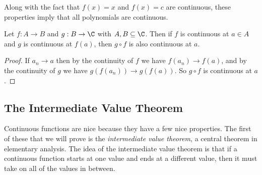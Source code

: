 Along with the fact that $f(x) = x$ and $f(x) = c$ are continuous, these properties imply that all polynomials are continuous.


\begin{proposition}
	Let $f: A \rightarrow B$ and $g: B \rightarrow \C$ with $A, B \subseteq \C$. Then if $f$ is continuous at $a \in A$ and $g$ is continuous at $f(a)$, then $g \circ f$ is also continuous at $a$.
\end{proposition}
\begin{proof}
	If $a_n \rightarrow a$ then by the continuity of $f$ we have $f(a_n) \rightarrow f(a)$, and by the continuity of $g$ we have $g(f(a_n)) \rightarrow g(f(a))$. So $g\circ f$ is continuous at $a$.
\end{proof}

\subsection{The Intermediate Value Theorem}

Continuous functions are nice because they have a few nice properties. The first of these that we will prove is the \emph{intermediate value theorem}, a central theorem in elementary analysis. The idea of the intermediate value theorem is that if a continuous function starts at one value and ends at a different value, then it must take on all of the values in between.

